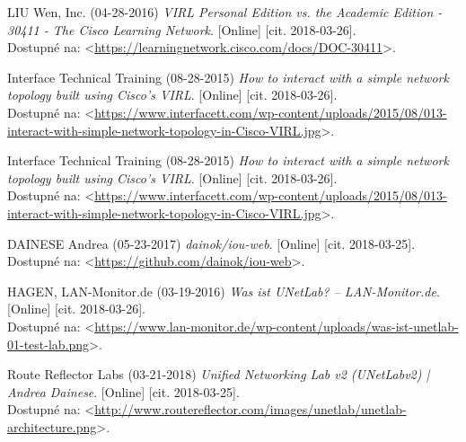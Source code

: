 \begin{thebibliography}{99}
LIU Wen, Inc. (04-28-2016) {\it VIRL Personal Edition vs. the Academic Edition - 30411 - The Cisco Learning Network}. [Online] [cit. 2018-03-26]. \\
Dostupné na: <\url{https://learningnetwork.cisco.com/docs/DOC-30411}>.

Interface Technical Training (08-28-2015) {\it How to interact with a simple network topology built using Cisco’s VIRL}. [Online] [cit. 2018-03-26]. \\
Dostupné na: <\url{https://www.interfacett.com/wp-content/uploads/2015/08/013-interact-with-simple-network-topology-in-Cisco-VIRL.jpg}>.

Interface Technical Training (08-28-2015) {\it How to interact with a simple network topology built using Cisco’s VIRL}. [Online] [cit. 2018-03-26]. \\
Dostupné na: <\url{https://www.interfacett.com/wp-content/uploads/2015/08/013-interact-with-simple-network-topology-in-Cisco-VIRL.jpg}>.

DAINESE Andrea (05-23-2017) {\it dainok/iou-web}. [Online] [cit. 2018-03-25]. \\
Dostupné na: <\url{https://github.com/dainok/iou-web}>.

HAGEN, LAN-Monitor.de  (03-19-2016) {\it Was ist UNetLab? – LAN-Monitor.de}. [Online] [cit. 2018-03-26]. \\
Dostupné na: <\url{https://www.lan-monitor.de/wp-content/uploads/was-ist-unetlab-01-test-lab.png}>.

Route Reflector Labs (03-21-2018) {\it Unified Networking Lab v2 (UNetLabv2) | Andrea Dainese}. [Online] [cit. 2018-03-25]. \\
Dostupné na: <\url{http://www.routereflector.com/images/unetlab/unetlab-architecture.png}>.

\end{thebibliography}

